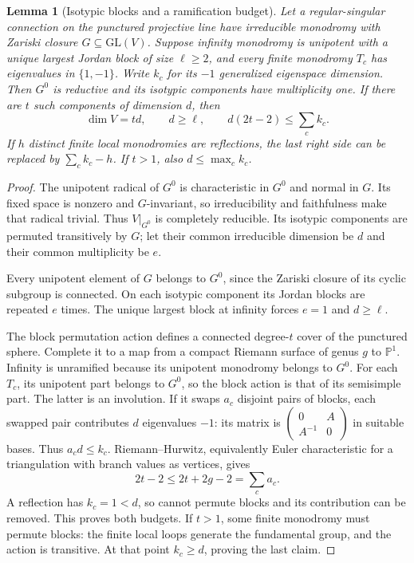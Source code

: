 \documentclass[11pt,a4paper]{article}
\newtheorem{lemma}[theorem]{Lemma}
\theoremstyle{definition}
\theoremstyle{remark}
\numberwithin{equation}{section}
\begin{document}
\begin{lemma}[Isotypic blocks and a ramification budget]
\label{p7:gn:blocks-budget}
Let a regular-singular connection on the punctured projective line
have irreducible monodromy with Zariski closure $G\subseteq\mathrm{GL}(V)$.
Suppose infinity monodromy is unipotent with a unique largest
Jordan block of size $\ell\ge2$, and every finite monodromy $T_c$
has eigenvalues in $\{1,-1\}$. Write $k_c$ for its $-1$ generalized
eigenspace dimension. Then $G^0$ is reductive and its isotypic
components have multiplicity one. If there are $t$ such components
of dimension $d$, then
\[
 \dim V=td,\qquad d\ge\ell,\qquad
                 d(2t-2)\le\sum_c k_c.
\]
If $h$ distinct finite local monodromies are reflections, the last
right side can be replaced by $\sum_c k_c-h$.
If $t>1$, also $d\le\max_c k_c$.
\end{lemma}
\begin{proof}
The unipotent radical of $G^0$ is characteristic in $G^0$ and normal
in $G$. Its fixed space is nonzero and $G$-invariant, so
irreducibility and faithfulness make that radical trivial.
Thus $V|_{G^0}$ is completely reducible. Its isotypic components
are permuted transitively by $G$; let their common irreducible
dimension be $d$ and their common multiplicity be $e$.

Every unipotent element of $G$ belongs to $G^0$, since the Zariski
closure of its cyclic subgroup is connected. On each isotypic
component its Jordan blocks are repeated $e$ times. The unique
largest block at infinity forces $e=1$ and $d\ge\ell$.

The block permutation action defines a connected degree-$t$ cover
of the punctured sphere. Complete it to a map from a compact
Riemann surface of genus $g$ to $\mathbb P^1$. Infinity is unramified
because its unipotent monodromy belongs to $G^0$. For each $T_c$,
its unipotent part belongs to $G^0$, so the block action is that
of its semisimple part. The latter is an involution. If it swaps
$a_c$ disjoint pairs of blocks, each swapped pair contributes
$d$ eigenvalues $-1$: its matrix is
$\left(\begin{smallmatrix}0&A\\A^{-1}&0\end{smallmatrix}\right)$
in suitable bases. Thus $a_cd\le k_c$.
Riemann--Hurwitz, equivalently Euler characteristic for a
triangulation with branch values as vertices, gives
\[
                 2t-2\le2t+2g-2=\sum_ca_c.
\]
A reflection has $k_c=1<d$, so cannot permute blocks and its
contribution can be removed. This proves both budgets.
If $t>1$, some finite monodromy must permute blocks: the finite
local loops generate the fundamental group, and the action is
transitive. At that point $k_c\ge d$, proving the last claim.
\end{proof}
\end{document}
